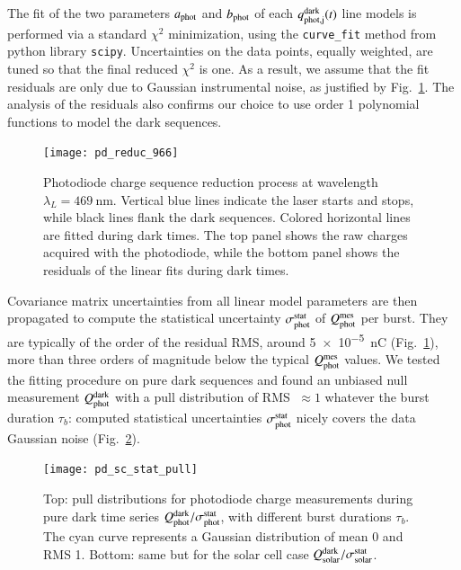 The fit of the two parameters $a_{\rm phot}$ and $b_{\rm phot}$ of each $q_{\rm phot,j}^{\rm dark}(t)$ line models is performed via a standard $\chi^2$ minimization, using the \texttt{curve\_fit} method from python library \texttt{scipy}. Uncertainties on the data points, equally weighted, are tuned so that the final reduced $\chi^2$ is one. As a result, we assume that the fit residuals are only due to Gaussian instrumental noise, as justified by Fig.~\ref{fig:pd_reduc}. The analysis of the residuals also confirms our choice to use order 1 polynomial functions to model the dark sequences.

\begin{figure}%
\centering
\texttt{[image: pd\_reduc\_966]}
\caption{Photodiode charge sequence reduction process at wavelength $\lambda_L=\SI{469}{\nm}$. Vertical blue lines indicate the laser starts and stops, while black lines flank the dark sequences. Colored horizontal lines are fitted during dark times. The top panel shows the raw charges acquired with the photodiode, while the bottom panel shows the residuals of the linear fits during dark times.}\label{fig:pd_reduc}
\end{figure}

Covariance matrix uncertainties from all linear model parameters are then propagated to compute the statistical uncertainty $\sigma_{\mathrm{phot}}^{\mathrm{stat}}$ of $Q_{\mathrm{phot}}^{\mathrm{mes}}$ per burst. They are typically of the order of the residual RMS, around \SI{5e-5}{\nano\coulomb} (Fig.~\ref{fig:pd_reduc}), more than three orders of magnitude below the typical $Q_{\mathrm{phot}}^{\mathrm{mes}}$ values. We tested the fitting procedure on pure dark sequences and found an unbiased null measurement $Q_{\mathrm{phot}}^{\rm dark}$ with a pull distribution of RMS $\;\approx 1$ whatever the burst duration $\tau_b$: computed statistical uncertainties $\sigma_{\mathrm{phot}}^{\mathrm{stat}}$ nicely covers the data Gaussian noise (Fig.~\ref{fig:charge_pull}).

\begin{figure}%
\centering
\texttt{[image: pd\_sc\_stat\_pull]}
\caption{Top: pull distributions for photodiode charge measurements during pure dark time series $Q_{\mathrm{phot}}^{\rm dark} / \sigma_{\mathrm{phot}}^{\mathrm{stat}}$, with different burst durations $\tau_b$. The cyan curve represents a Gaussian distribution of mean 0 and RMS 1. Bottom: same but for the solar cell case $Q_{\mathrm{solar}}^{\rm dark} / \sigma_{\mathrm{solar}}^{\mathrm{stat}}$.}\label{fig:charge_pull}
\end{figure}



